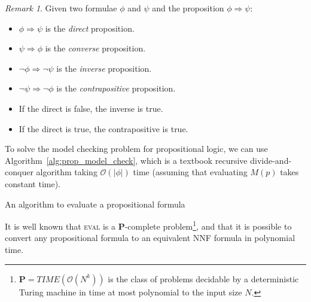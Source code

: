 \documentclass{article}
\theoremstyle{example}
\theoremstyle{remark}
\newtheorem{remark}{Remark}
\renewcommand{\implies}{\Rightarrow}
\newcommand{\BigO}{\mathcal{O}}
\newcommand{\abs}[1]{\left\lvert{#1}\right\rvert}
\begin{document}
\begin{remark}
	Given two formulae \(\phi \) and \(\psi \) and the proposition \(\phi \implies \psi \):
	\begin{itemize}
		\item \(\phi \implies \psi \) is the \emph{direct} proposition.
		\item \(\psi \implies \phi \) is the \emph{converse} proposition.
		\item \(\neg\phi \implies \neg\psi \) is the \emph{inverse} proposition.
		\item \(\neg\psi \implies \neg\phi \) is the \emph{contrapositive} proposition.
		\item If the direct is false, the inverse is true.
		\item If the direct is true, the contrapositive is true.
	\end{itemize}
\end{remark}

\noindent To solve the model checking problem for propositional logic, we can use
Algorithm~\ref{alg:prop_model_check}, which is a textbook recursive divide-and-conquer algorithm
taking \(\BigO\left(\abs{\phi}\right)\) time (assuming that evaluating \(M\left(p\right)\) takes constant
time).
\begin{algorithm}
	\centering
	\begin{algorithmic}
		\Switch{\(\phi \)}
		\Else{}
		\EndIf{}
		\EndCase{}

		\EndCase{}

		\EndCase{}

		\EndCase{}
		\EndSwitch{}
		\EndFunction{}
	\end{algorithmic}
	\caption{An algorithm to evaluate a propositional formula}\label{alg:prop_model_check}
\end{algorithm}

\noindent It is well known that \textsc{eval} is a \textbf{P}-complete problem\footnote{
	\(\textbf{P} = TIME\left(\BigO\left(N^k\right)\right)\) is the class of problems decidable by a
	deterministic Turing machine in time at most polynomial to the input size \(N\).}, and that it
is possible to convert any propositional formula to an equivalent NNF formula in polynomial time.
\end{document}
